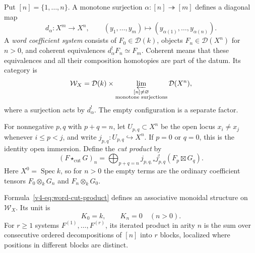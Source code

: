 Put \([n]=\{1,\ldots,n\}\). A monotone surjection
\(\alpha:[n]\twoheadrightarrow[m]\) defines a diagonal map
\[
 d_\alpha:X^m\longrightarrow X^n,
 \qquad (y_1,\ldots,y_m)\longmapsto
                  (y_{\alpha(1)},\ldots,y_{\alpha(n)}).
\]
A \emph{word coefficient system} consists of \(F_0\in\mathcal D(k)\),
objects \(F_n\in\mathcal D(X^n)\) for \(n>0\), and coherent
equivalences \(d_\alpha^!F_n\simeq F_m\). Coherent means that
these equivalences and all their composition homotopies are part of
the datum. Its category is
\[
 \mathcal W_X=
 \mathcal D(k)\times
 \varprojlim_{\substack{[n]\ne\varnothing\\
                        \text{monotone surjections}}}
                       \mathcal D(X^n),
\]
where a surjection acts by \(d_\alpha^!\).
The empty configuration is a separate factor.

For nonnegative \(p,q\) with \(p+q=n\), let
\(U_{p,q}\subset X^n\) be the open locus
\(x_i\ne x_j\) whenever \(i\le p<j\), and write
\(j_{p,q}:U_{p,q}\hookrightarrow X^n\). If \(p=0\) or \(q=0\),
this is the identity open immersion. Define the \emph{cut product} by
\begin{equation}\label{v4-eq:word-cut-product}
 (F\star_{\mathrm{cut}}G)_n
   =\bigoplus_{p+q=n}
      j_{p,q,*}j_{p,q}^!(F_p\boxtimes G_q).
\end{equation}
Here \(X^0=\operatorname{Spec}k\), so for \(n>0\) the empty terms are the
ordinary coefficient tensors \(F_0\otimes_k G_n\) and
\(F_n\otimes_k G_0\).

\begin{proposition}\label{v4-prop:word-cut-product}
Formula~\eqref{v4-eq:word-cut-product} defines an associative
monoidal structure on \(\mathcal W_X\). Its unit is
\[
 K_0=k,\qquad K_n=0\quad(n>0).
\]
For \(r\ge1\) systems \(F^{(1)},\ldots,F^{(r)}\), its iterated product in
arity \(n\) is the sum over consecutive ordered decompositions of
\([n]\) into \(r\) blocks, localized where positions in different
blocks are distinct.
\end{proposition}

